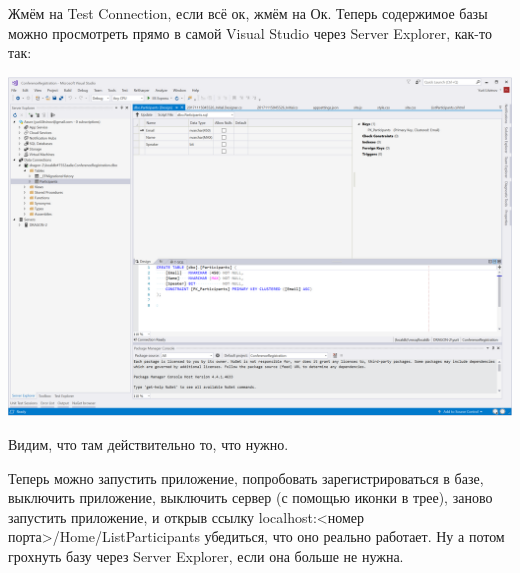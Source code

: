 \documentclass[a5paper]{article}
\begin{document}
Жмём на Test Connection, если всё ок, жмём на Ок. Теперь содержимое базы можно просмотреть прямо в самой Visual Studio через Server Explorer, как-то так:

\begin{center}
    \includegraphics[width=\textwidth]{databaseView.png}
\end{center}

Видим, что там действительно то, что нужно.

Теперь можно запустить приложение, попробовать зарегистрироваться в базе, выключить приложение, выключить сервер (с помощью иконки в трее), заново запустить приложение, и открыв ссылку localhost:<номер порта>/Home/ListParticipants убедиться, что оно реально работает.
Ну а потом грохнуть базу через Server Explorer, если она больше не нужна.
\end{document}
